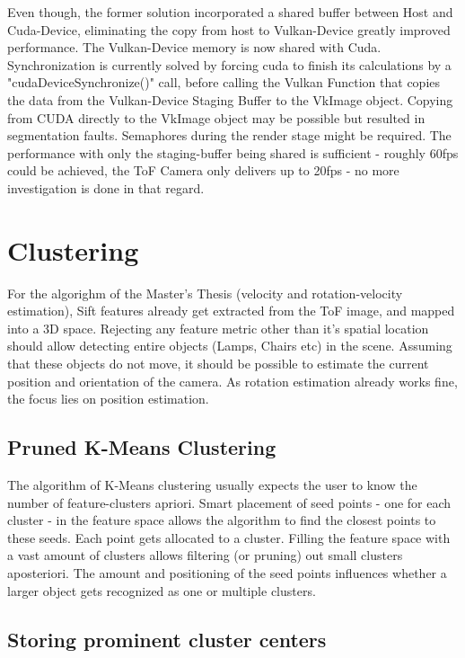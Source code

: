 Even though, the former solution incorporated a shared buffer between Host and Cuda-Device, eliminating the copy from host to Vulkan-Device greatly improved performance. The Vulkan-Device memory is now shared with Cuda. \\
Synchronization is currently solved by forcing cuda to finish its calculations by a "cudaDeviceSynchronize()" call, before calling the Vulkan Function that copies the data from the Vulkan-Device Staging Buffer to the VkImage object. Copying from CUDA directly to the VkImage object may be possible but resulted in segmentation faults. Semaphores during the render stage might be required. The performance with only the staging-buffer being shared is sufficient - roughly 60fps could be achieved, the ToF Camera only delivers up to 20fps - no more investigation is done in that regard.

\chapter{Clustering}
For the algorighm of the Master's Thesis (velocity and rotation-velocity estimation), Sift features already get extracted from the ToF image, and mapped into a 3D space. Rejecting any feature metric other than it's spatial location should allow detecting entire objects (Lamps, Chairs etc) in the scene. Assuming that these objects do not move, it should be possible to estimate the current position and orientation of the camera. As rotation estimation already works fine, the focus lies on position estimation.
\section{Pruned K-Means Clustering}
The algorithm of K-Means clustering usually expects the user to know the number of feature-clusters apriori. Smart placement of seed points - one for each cluster - in the feature space allows the algorithm to find the closest points to these seeds. Each point gets allocated to a cluster. Filling the feature space with a vast amount of clusters allows filtering (or pruning) out small clusters aposteriori. The amount and positioning of the seed points influences whether a larger object gets recognized as one or multiple clusters. 

\section{Storing prominent cluster centers}



